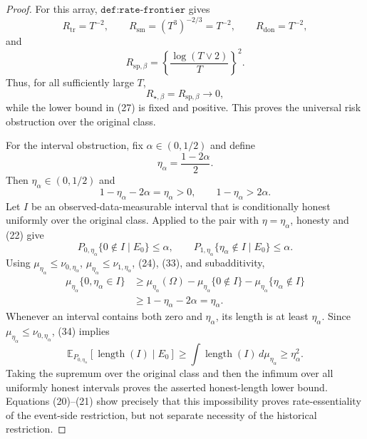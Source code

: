 \documentclass{article}
\begin{document}
\begin{proof}
For this array, \(\texttt{def:rate-frontier}\) gives
\[
R_{\mathrm{tr}}=T^{-2},
\qquad
R_{\mathrm{sm}}=(T^3)^{-2/3}=T^{-2},
\qquad
R_{\mathrm{don}}=T^{-2},
\tag{28}
\]
and
\[
R_{\mathrm{sp},\beta}
=\left\{\frac{\log(T\vee2)}T\right\}^{2}.
\tag{29}
\]
Thus, for all sufficiently large \(T\),
\[
R_{\star,\beta}=R_{\mathrm{sp},\beta}\longrightarrow0,
\tag{30}
\]
while the lower bound in (27) is fixed and positive.  This proves the universal risk obstruction over the original class.

For the interval obstruction, fix \(\alpha\in(0,1/2)\) and define
\[
\eta_\alpha=\frac{1-2\alpha}{2}.
\tag{31}
\]
Then \(\eta_\alpha\in(0,1/2)\) and
\[
1-\eta_\alpha-2\alpha=\eta_\alpha>0,
\qquad
1-\eta_\alpha>2\alpha.
\tag{32}
\]
Let \(I\) be an observed-data-measurable interval that is conditionally honest uniformly over the original class.  Applied to the pair with \(\eta=\eta_\alpha\), honesty and (22) give
\[
P_{0,\eta_\alpha}\{0\notin I\mid E_0\}\le\alpha,
\qquad
P_{1,\eta_\alpha}\{\eta_\alpha\notin I\mid E_0\}\le\alpha.
\tag{33}
\]
Using \(\mu_{\eta_\alpha}\le\nu_{0,\eta_\alpha}\), \(\mu_{\eta_\alpha}\le\nu_{1,\eta_\alpha}\), (24), (33), and subadditivity,
\[
\begin{aligned}
\mu_{\eta_\alpha}\{0,\eta_\alpha\in I\}
&\ge \mu_{\eta_\alpha}(\Omega)
-\mu_{\eta_\alpha}\{0\notin I\}
-\mu_{\eta_\alpha}\{\eta_\alpha\notin I\}\\
&\ge1-\eta_\alpha-2\alpha
=\eta_\alpha.
\end{aligned}
\tag{34}
\]
Whenever an interval contains both zero and \(\eta_\alpha\), its length is at least \(\eta_\alpha\).  Since \(\mu_{\eta_\alpha}\le\nu_{0,\eta_\alpha}\), (34) implies
\[
\mathbb E_{P_{0,\eta_\alpha}}[\operatorname{length}(I)\mid E_0]
\ge\int\operatorname{length}(I)\,d\mu_{\eta_\alpha}
\ge\eta_\alpha^2.
\tag{35}
\]
Taking the supremum over the original class and then the infimum over all uniformly honest intervals proves the asserted honest-length lower bound.  Equations (20)--(21) show precisely that this impossibility proves rate-essentiality of the event-side restriction, but not separate necessity of the historical restriction.


\end{proof}
\end{document}
